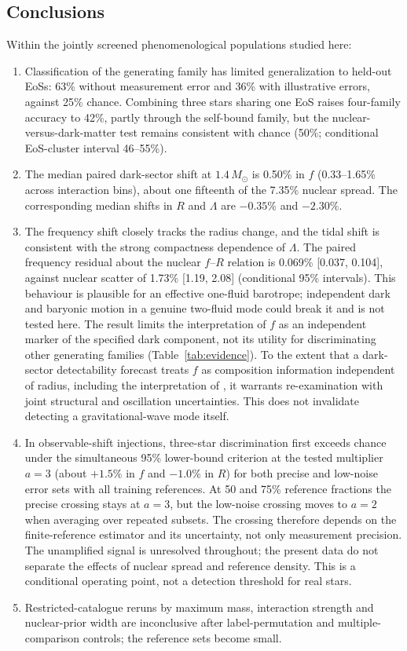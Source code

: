 \documentclass[11pt,a4paper]{article}
\begin{document}
\subsection*{Conclusions}
Within the jointly screened phenomenological populations studied here:
\begin{enumerate}
\item Classification of the generating family has limited generalization to held-out EoSs: 63\% without measurement error and 36\% with illustrative errors, against 25\% chance. Combining three stars sharing one EoS raises four-family accuracy to 42\%, partly through the self-bound family, but the nuclear-versus-dark-matter test remains consistent with chance (50\%; conditional EoS-cluster interval 46--55\%).
\item The median paired dark-sector shift at $1.4\,M_\odot$ is 0.50\% in $f$ (0.33--1.65\% across interaction bins), about one fifteenth of the 7.35\% nuclear spread. The corresponding median shifts in $R$ and $\Lambda$ are $-0.35\%$ and $-2.30\%$.
\item The frequency shift closely tracks the radius change, and the tidal shift is consistent with the strong compactness dependence of $\Lambda$. The paired frequency residual about the nuclear $f$--$R$ relation is 0.069\% [0.037, 0.104], against nuclear scatter of 1.73\% [1.19, 2.08] (conditional 95\% intervals). This behaviour is plausible for an effective one-fluid barotrope; independent dark and baryonic motion in a genuine two-fluid mode could break it and is not tested here. The result limits the interpretation of $f$ as an independent marker of the specified dark component, not its utility for discriminating other generating families (Table~\ref{tab:evidence}). To the extent that a dark-sector detectability forecast treats $f$ as composition information independent of radius, including the interpretation of \citet{HusainOsc}, it warrants re-examination with joint structural and oscillation uncertainties. This does not invalidate detecting a gravitational-wave mode itself.
\item In observable-shift injections, three-star discrimination first exceeds chance under the simultaneous 95\% lower-bound criterion at the tested multiplier $a=3$ (about $+1.5\%$ in $f$ and $-1.0\%$ in $R$) for both precise and low-noise error sets with all training references. At 50 and 75\% reference fractions the precise crossing stays at $a=3$, but the low-noise crossing moves to $a=2$ when averaging over repeated subsets. The crossing therefore depends on the finite-reference estimator and its uncertainty, not only measurement precision. The unamplified signal is unresolved throughout; the present data do not separate the effects of nuclear spread and reference density. This is a conditional operating point, not a detection threshold for real stars.
\item Restricted-catalogue reruns by maximum mass, interaction strength and nuclear-prior width are inconclusive after label-permutation and multiple-comparison controls; the reference sets become small.
\end{enumerate}
\end{document}
